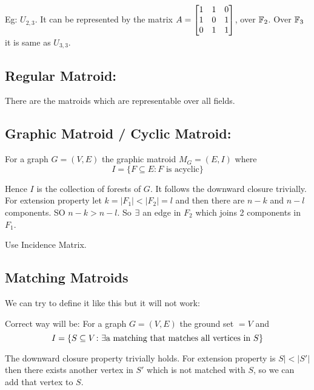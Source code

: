 \documentclass[twoside]{article}
\begin{document}
	Eg: $U_{2,3}$. It can be represented by the matrix $A=\left[\begin{matrix}1&1&0\\ 1& 0 & 1\\ 0& 1& 1\end{matrix}\right]$, over $\mathbb{F}_2$. Over $\mathbb{F}_3$ it is same as $U_{3,3}$. 
	
	\subsection{Regular Matroid:} There are the matroids which are representable over all fields.
	
	\subsection{Graphic Matroid / Cyclic Matroid:} For a graph $G=(V,E)$ the graphic matroid $M_G=(E,I)$ where $$I=\{F\subseteq E\colon \text{$F$ is acyclic}\}$$
	
	Hence $I$ is the collection of forests of $G$. It follows the downward closure trivially. For extension property let $k=|F_1|<|F_2|=l$ and then there are $n-k$ and $n-l$ components. SO $n-k>n-l$. So $\exists$ an edge in $F_2$ which joins 2 components in $F_1$.
	\begin{proof-idea}
		Use Incidence Matrix.
	\end{proof-idea}
	\subsection{Matching Matroids}
	We can try to define it like this but it will not work:
\parinf

Correct way will be: For a graph $G=(V,E)$ the ground set $=V$ and $$I=\{S\subseteq V\colon \exists \text{a matching that matches all vertices in $S$}\}$$\parinn

The downward closure property trivially holds. For extension property is $S|<|S'|$ then there exists another vertex in $S'$ which is not matched with $S$, so we can add that vertex to $S$. 
\end{document}
